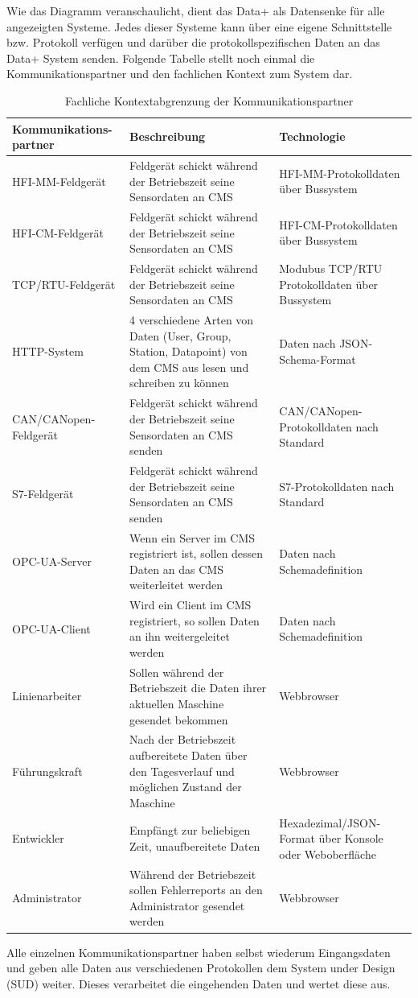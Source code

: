 Wie das Diagramm veranschaulicht, dient das Data+ als Datensenke für alle angezeigten Systeme. Jedes dieser Systeme kann über eine eigene Schnittstelle bzw. Protokoll verfügen und darüber die protokollspezifischen Daten an das Data+ System senden.
Folgende Tabelle stellt noch einmal die Kommunikationspartner und den fachlichen Kontext zum System dar.\\
\begin{table}[th]
	\begin{tabularx}{\textwidth}{|p{3.5cm}|p{7cm}|X|}
		\hline
		Kommunikations-
		partner & Beschreibung & Technologie \\
		\hline
		HFI-MM-Feldgerät &Feldgerät schickt während der Betriebszeit seine Sensordaten an CMS  & HFI-MM-Protokolldaten über Bussystem\\
		\hline
		HFI-CM-Feldgerät & Feldgerät schickt während der Betriebszeit seine Sensordaten an CMS  & HFI-CM-Protokolldaten über Bussystem\\
		\hline
		TCP/RTU-Feldgerät &Feldgerät schickt während der Betriebszeit seine Sensordaten an CMS  & Modubus TCP/RTU Protokolldaten über Bussystem \\
		\hline
		HTTP-System & 4 verschiedene Arten von Daten (User, Group, Station, Datapoint) von dem CMS aus lesen und schreiben zu können & Daten nach JSON-Schema-Format \\
		\hline
		CAN/CANopen-Feldgerät & Feldgerät schickt während der Betriebszeit seine Sensordaten an CMS senden & CAN/CANopen-Protokolldaten nach Standard\\
		\hline
		S7-Feldgerät &Feldgerät schickt während der Betriebszeit seine Sensordaten an CMS senden & S7-Protokolldaten nach Standard\\
		\hline
		OPC-UA-Server & Wenn ein Server im CMS registriert ist, sollen dessen Daten an das CMS weiterleitet werden & Daten nach Schemadefinition\\
		\hline
		OPC-UA-Client & Wird ein Client im CMS registriert, so sollen Daten an ihn weitergeleitet werden & Daten nach Schemadefinition\\
		\hline
		Linienarbeiter & Sollen während der Betriebszeit die Daten ihrer aktuellen Maschine gesendet bekommen & Webbrowser\\
		\hline
		Führungskraft & Nach der Betriebszeit aufbereitete Daten über den Tagesverlauf und möglichen Zustand der Maschine & Webbrowser\\
		\hline
		Entwickler & Empfängt zur beliebigen Zeit, unaufbereitete Daten & Hexadezimal/JSON-Format über Konsole oder Weboberfläche\\
		\hline
		Administrator & Während der Betriebszeit sollen Fehlerreports an den Administrator gesendet werden & Webbrowser\\
		\hline
	\end{tabularx} 
	\caption{Fachliche Kontextabgrenzung der Kommunikationspartner}
	\label{tab:FachlicheKontextabgrenzungDerKommunikationspartner}
\end{table}
Alle einzelnen Kommunikationspartner haben selbst wiederum Eingangsdaten und geben alle Daten aus verschiedenen Protokollen dem System under Design (SUD) weiter. Dieses verarbeitet die eingehenden Daten und wertet diese aus.
\clearpage
